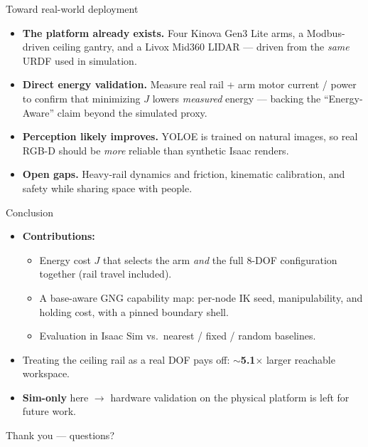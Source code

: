 \documentclass[aspectratio=169]{beamer}
\begin{document}
\begin{frame}{Toward real-world deployment}
  \begin{itemize}
    \item \textbf{The platform already exists.} Four Kinova Gen3 Lite arms, a
          Modbus-driven ceiling gantry, and a Livox Mid360 LIDAR --- driven from
          the \emph{same} URDF used in simulation.
    \item \textbf{Direct energy validation.} Measure real rail + arm motor
          current / power to confirm that minimizing $J$ lowers \emph{measured}
          energy --- backing the ``Energy-Aware'' claim beyond the simulated proxy.
    \item \textbf{Perception likely improves.} YOLOE is trained on natural images,
          so real RGB-D should be \emph{more} reliable than synthetic Isaac renders.
    \item \textbf{Open gaps.} Heavy-rail dynamics and friction, kinematic
          calibration, and safety while sharing space with people.
  \end{itemize}
\end{frame}

\begin{frame}{Conclusion}
  \begin{itemize}
    \item \textbf{Contributions:}
      \begin{itemize}
        \item Energy cost $J$ that selects the arm \emph{and} the full 8-DOF
              configuration together (rail travel included).
        \item A base-aware GNG capability map: per-node IK seed, manipulability,
              and holding cost, with a pinned boundary shell.
        \item Evaluation in Isaac Sim vs.\ nearest / fixed / random baselines.
      \end{itemize}
    \item Treating the ceiling rail as a real DOF pays off: \textbf{$\sim$5.1$\times$}
          larger reachable workspace.
    \item \textbf{Sim-only} here $\to$ hardware validation on the physical platform
          is left for future work.
  \end{itemize}
  \vfill
  \centering \Large Thank you --- questions?
\end{frame}
\end{document}
